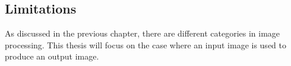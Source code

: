 \subsection{Limitations}

As discussed in the previous chapter, there are different categories in image processing. This thesis will focus on the case where an input image is used to produce an output image. 
